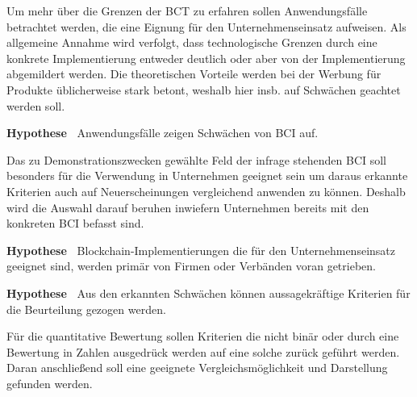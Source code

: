 Um mehr über die Grenzen der \gls{BCT} zu erfahren sollen Anwendungsfälle betrachtet werden, die eine Eignung für den Unternehmenseinsatz aufweisen.
Als allgemeine Annahme wird verfolgt, dass technologische Grenzen durch eine konkrete Implementierung entweder deutlich oder aber von der Implementierung abgemildert werden.
Die theoretischen Vorteile werden bei der Werbung für Produkte üblicherweise stark betont, weshalb hier insb. auf Schwächen geachtet werden soll.

\textbf{Hypothese~} Anwendungsfälle zeigen Schwächen von \gls{BCI} auf.

Das zu Demonstrationszwecken gewählte Feld der infrage stehenden \gls{BCI} soll besonders für die Verwendung in Unternehmen geeignet sein um daraus erkannte Kriterien auch auf Neuerscheinungen vergleichend anwenden zu können.
Deshalb wird die Auswahl darauf beruhen inwiefern Unternehmen bereits mit den konkreten \gls{BCI} befasst sind.

\textbf{Hypothese~} Blockchain-Implementierungen die für den Unternehmenseinsatz geeignet sind, werden primär von Firmen oder Verbänden voran getrieben.

\textbf{Hypothese~} Aus den erkannten Schwächen können aussagekräftige Kriterien für die Beurteilung gezogen werden.

Für die quantitative Bewertung sollen Kriterien die nicht binär oder durch eine Bewertung in Zahlen ausgedrück werden auf eine solche zurück geführt werden.
Daran anschließend soll eine geeignete Vergleichsmöglichkeit und Darstellung gefunden werden.



%

%

%



